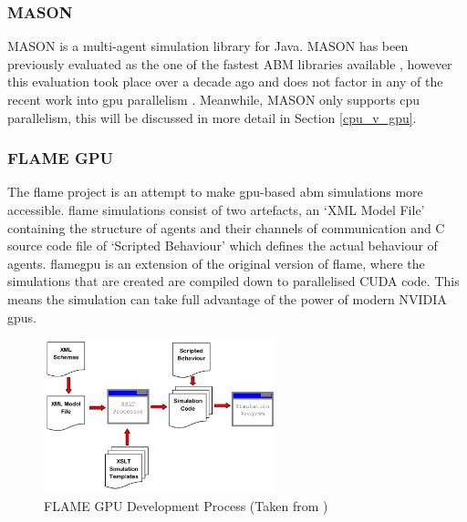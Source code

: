 \documentclass{UoYCSproject}
\begin{document}
\subsubsection{\gls{MASON}}
\gls{MASON} is a multi-agent simulation library for Java.
\gls{MASON} has been previously evaluated as the one of the fastest ABM libraries available \cite{abm_platforms_review}, however this evaluation took place over a decade ago and does not factor in any of the recent work into \acrshort{gpu} parallelism \cite{flame_simulation, biocellion_paper, physicell}.
Meanwhile, \gls{MASON} only supports \gls{cpu} parallelism, this will be discussed in more detail in Section \ref{cpu_v_gpu}.



\subsubsection{\gls{FLAME GPU}}
\label{flame_gpu}
The \gls{flame} project is an attempt to make \gls{gpu}-based \gls{abm} simulations more accessible.
\gls{flame} simulations consist of two artefacts, an `XML Model File' containing the structure of agents and their channels of communication and C source code file of `Scripted Behaviour' which defines the actual behaviour of agents.
\acrfull{flamegpu} is an extension of the original version of \acrshort{flame}, where the simulations that are created are compiled down to parallelised CUDA code.
This means the simulation can take full advantage of the power of modern NVIDIA \acrshort{gpu}s.

\begin{figure}[htp]
\centering
\includegraphics[width=0.6\textwidth]{Appendix/FLAME_Process}
\caption{\gls{FLAME GPU} Development Process (Taken from \cite{flame_simulation})}
\label{fig:flame_dev}
\end{figure}
\end{document}
